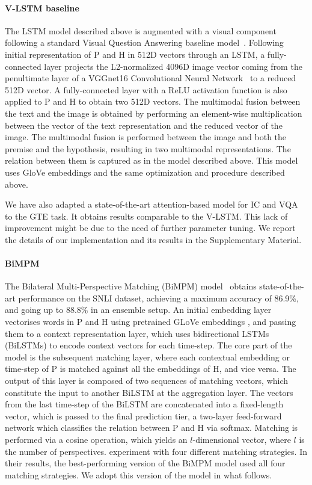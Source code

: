 \documentclass[11pt]{article}
\begin{document}
\paragraph{V-LSTM baseline} The LSTM model described above is
augmented with a visual component following a standard Visual Question Answering baseline model~\cite{anto:vqa15}.  
Following initial representation of P and H in 512D vectors through an LSTM,
a fully-connected layer projects the L2-normalized 4096D image vector coming from the penultimate layer of a VGGnet16
Convolutional Neural Network~ \cite{simonyan2014:vggnet} to a reduced 512D vector.
A fully-connected layer with a ReLU activation function is also applied to P and H
to obtain two 512D vectors. 
The multimodal fusion between the text and the image is obtained
by performing an element-wise multiplication between the
vector of the text representation and the reduced vector of the
image. The multimodal fusion is performed between the image and both the premise and the hypothesis, resulting in two multimodal representations. The relation between them is captured as in the model described above. This model uses GloVe embeddings and the same optimization and procedure described above.

We have also adapted a state-of-the-art attention-based model for IC and VQA~\cite{Anderson2017up-down,teney2017:tips} to the GTE task. It obtains results comparable to the V-LSTM. This lack of improvement might be due to the need of
  further parameter tuning. We report the details of  our implementation
  and its results in the Supplementary Material.

\paragraph{BiMPM}
The Bilateral Multi-Perspective Matching (BiMPM) model~\cite{Wang2017} obtains state-of-the-art performance on the SNLI dataset, achieving a maximum
accuracy of 86.9\%, and going up to 88.8\% in an ensemble setup.
An initial embedding layer vectorises words in P and H using pretrained GLoVe embeddings \cite{Pennington2014}, and passing them to a context representation layer, which uses bidirectional LSTMs (BiLSTMs) to encode context vectors for each time-step. The core part of the model is the subsequent matching layer, where each contextual embedding or time-step of P is matched against all the embeddings of H, and vice versa.
The output of this layer is composed of two sequences of matching vectors, which constitute the input to another BiLSTM at the aggregation layer. The vectors from the last time-step of the BiLSTM are concatenated into a fixed-length vector, which is passed to the final prediction tier, a two-layer feed-forward network which classifies the relation between P and H via softmax.
Matching is performed via a cosine operation, which yields an $l$-dimensional vector, where $l$ is the number of perspectives.  experiment with four different matching strategies.
In their results, the best-performing version of the BiMPM model used all four matching strategies. We adopt this version of the model in what follows.
\end{document}
